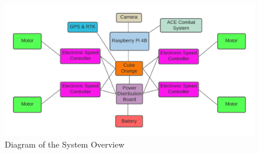 \begin{figure}[h!]
    \centering
    \includegraphics[width=1\textwidth]{images/system_overview.png}
    \caption{Diagram of the System Overview}
\end{figure}
